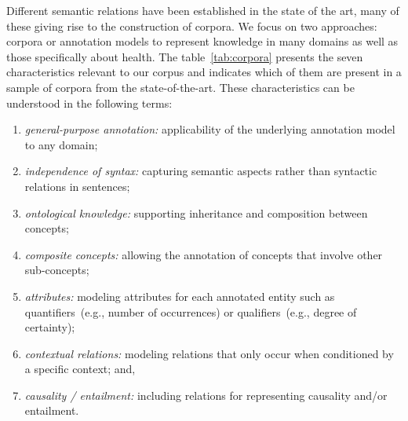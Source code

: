   Different semantic relations have been established  in the state of the art, many of these giving rise to the construction of corpora. We focus on two approaches: corpora or annotation models to represent knowledge in many domains as well as those specifically about health.
  The table~\ref{tab:corpora}  presents the seven characteristics relevant to our corpus and indicates which of them are present in a sample of corpora from the state-of-the-art.
  These characteristics can be understood in the following terms:
  \begin{enumerate}
  \item \textit{general-purpose annotation:} applicability of the underlying annotation model to any domain;
  \item \textit{independence of syntax:} capturing semantic aspects rather than syntactic relations in sentences;
  \item \textit{ontological knowledge:} supporting inheritance and composition between concepts;
  \item \textit{composite concepts:} allowing the annotation of concepts that involve other sub-concepts;
  \item \textit{attributes:} modeling attributes for each annotated entity such as quantifiers~(e.g., number of occurrences) or qualifiers~(e.g., degree of certainty);
  \item \textit{contextual relations:} modeling relations that only occur when conditioned by a specific context; and,
  \item \textit{causality / entailment:} including relations for representing causality and/or entailment.
  \end{enumerate}

